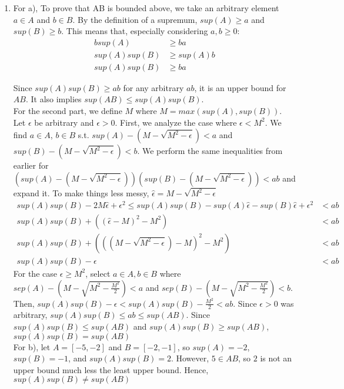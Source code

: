 \documentclass{article}
\begin{document}
\begin{enumerate}[leftmargin=*, label=\arabic*.]
  \item 
  For a), To prove that AB is bounded above, we take an arbitrary element $a \in A$ and $b \in B$. By the definition of a supremum, $sup(A) \geq a$ and $sup(B) \geq b$. This means that, especially considering $a, b \geq 0$: 
  \begin{align*}
      bsup(A) &\geq ba \\
      sup(A)sup(B) &\geq sup(A)b \\
      sup(A)sup(B) &\geq ba
  \end{align*}

  Since $sup(A)sup(B) \geq ab$ for any arbitrary $ab$, it is an upper  bound for $AB$. It also implies $sup(AB) \leq sup(A)sup(B)$. \\
  
  For the second part, we define $M$ where $M = max(sup(A), sup(B))$. Let $\epsilon$ be arbitrary and $\epsilon > 0$. First, we analyze the case where $\epsilon < M^2$. We find $a \in A$, $b \in B$ s.t. $sup(A) - (M - \sqrt{M^2 - \epsilon}) < a$ and $sup(B) - (M - \sqrt{M^2 - \epsilon}) < b$. We perform the same inequalities from earlier for $(sup(A) - (M - \sqrt{M^2 - \epsilon}))(sup(B) - (M - \sqrt{M^2 - \epsilon})) < ab$ and expand it. To make things less messy, $\hat{\epsilon} = M - \sqrt{M^2 - \epsilon}$
  \begin{align*}
      sup(A)sup(B)-2M\hat{\epsilon} + \epsilon^2 \leq sup(A)sup(B)-sup(A)\hat{\epsilon} - sup(B)\hat{\epsilon} + \epsilon^2 &< ab\\
      sup(A)sup(B) + ((\hat{\epsilon}-M)^2 - M^2) &< ab\\
      sup(A)sup(B) + (((M - \sqrt{M^2 - \epsilon})-M)^2-M^2) &< ab\\
      sup(A)sup(B) - \epsilon &< ab
  \end{align*}
  For the case $\epsilon \geq M^2$, select $a \in A, b \in B$ where $sep(A) - (M - \sqrt{M^2-\frac{M^2}{2}}) < a$ and $sep(B) - (M - \sqrt{M^2-\frac{M^2}{2}}) < b$. Then, $sup(A)sup(B) - \epsilon < sup(A)sup(B) - \frac{M^2}{2} < ab$. Since $\epsilon > 0$ was arbitrary, $sup(A)sup(B) \leq ab \leq sup(AB)$. Since $sup(A)sup(B) \leq sup(AB)$ and $sup(A)sup(B) \geq sup(AB)$, $sup(A)sup(B) = sup(AB)$ \\

  For b), let $A = [-5, -2]$ and $B = [-2, -1]$, so $sup(A) = -2$, $sup(B) = -1$, and $sup(A)sup(B) = 2$. However, $5 \in AB$, so $2$ is not an upper bound much less the least upper bound. Hence, $sup(A)sup(B) \neq sup(AB)$


\end{enumerate}
\end{document}

